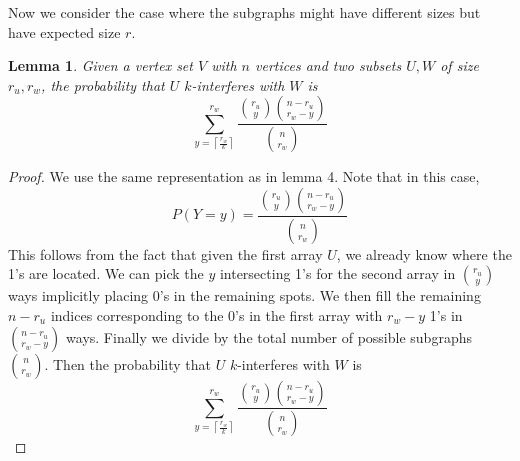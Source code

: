 \documentclass[10pt]{extarticle}
\newtheorem{lemma}[theorem]{Lemma}
\theoremstyle{definition}
\begin{document}



Now we consider the case where the subgraphs might have different sizes but have expected size $r$.

\begin{lemma}
    Given a vertex set $V$ with $n$ vertices and two subsets $U,W$ of size $r_u,r_w$, the probability that $U$ $k$-interferes with $W$ is 
    \begin{equation*}
        \sum_{y = \left\lceil \frac{r_w}{k} \right\rceil}^{r_w}  \frac{\binom{r_u}{y} \binom{n-r_u}{r_w-y}}{\binom{n}{r_w}}
    \end{equation*}
\end{lemma}
\begin{proof}
    We use the same representation as in lemma 4. Note that in this case,
    \begin{equation}
        P(Y=y) = \frac{\binom{r_u}{y} \binom{n-r_u}{r_w-y}}{\binom{n}{r_w}}
    \end{equation}
    This follows from the fact that given the first array $U$, we already know where the 1's are located. We can pick the $y$ intersecting 1's for the second array in $\binom{r_u}{y}$ ways implicitly placing 0's in the remaining spots. We then fill the remaining $n-r_u$ indices corresponding to the 0's in the first array with $r_w-y$ 1's in $\binom{n-r_u}{r_w-y}$ ways. Finally we divide by the total number of possible subgraphs $\binom{n}{r_w}$. 
    Then the probability that $U$ $k$-interferes with $W$ is 
    \begin{equation}
        \sum_{y = \left\lceil \frac{r_w}{k} \right\rceil}^{r_w}  \frac{\binom{r_u}{y} \binom{n-r_u}{r_w-y}}{\binom{n}{r_w}}
    \end{equation}
\end{proof}
\end{document}
